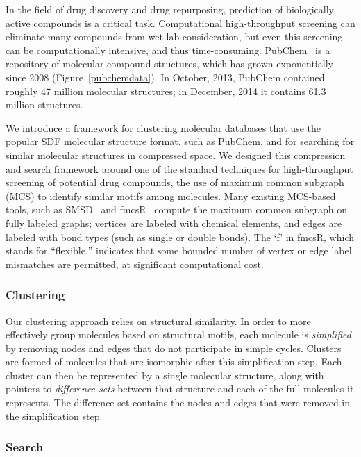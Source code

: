 \documentclass[review,preprint,12pt]{elsarticle}
\renewcommand{\cite}{\citep} %
\theoremstyle{definition}
\theoremstyle{remark}
\numberwithin{equation}{section}
\begin{document}
In the field of drug discovery and drug repurposing, prediction of biologically 
active compounds is a critical task. 
Computational high-throughput screening can eliminate many compounds from 
wet-lab consideration, but even this screening can be computationally 
intensive, and thus time-consuming.
PubChem~\cite{bolton2008pubchem} is a repository of molecular compound 
structures, 
which has grown exponentially since 2008 (Figure~\ref{pubchemdata}). 
In October, 2013, PubChem contained roughly 47 million molecular structures; 
in December, 2014 it contains 61.3 million structures.

We introduce a framework for clustering molecular databases that use the 
popular SDF molecular structure format, such as PubChem, and for searching for 
similar molecular structures in compressed space.
We designed this compression and search framework around one of the standard 
techniques for high-throughput screening of potential drug compounds, the use 
of maximum common subgraph (MCS) to identify similar motifs among molecules.
Many existing MCS-based tools, such as SMSD~\cite{rahman2009small} and 
fmcsR~\cite{cao2008maximum} compute the maximum common subgraph on fully 
labeled graphs; 
vertices are labeled with chemical elements, and edges are labeled with bond 
types (such as single or double bonds).
The `f' in fmcsR, which stands for ``flexible,'' indicates that some bounded 
number of vertex or edge label mismatches are permitted, at significant 
computational cost.

\subsubsection{Clustering}


Our clustering approach relies on structural similarity.
In order to more effectively group molecules based on structural motifs,
each molecule is \emph{simplified} by removing nodes and edges that do not
participate in simple cycles.
Clusters are formed of molecules that are isomorphic after this simplification
step.
Each cluster can then be represented by a single molecular structure, along 
with pointers to \emph{difference sets} between that structure and each of the 
full molecules it represents.
The difference set contains the nodes and edges that were removed in the 
simplification step.

\subsubsection{Search}
\end{document}
